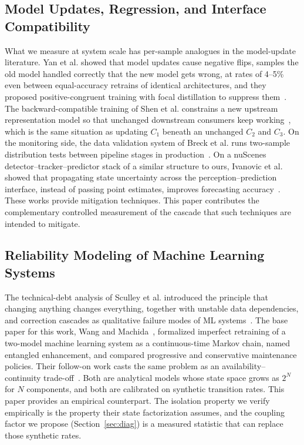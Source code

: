 \documentclass[conference]{IEEEtran}
\begin{document}
\subsection{Model Updates, Regression, and Interface Compatibility}
What we measure at system scale has per-sample analogues in the model-update
literature. Yan et al. showed that model updates cause negative flips, samples
the old model handled correctly that the new model gets wrong, at rates of
4--5\% even between equal-accuracy retrains of identical architectures, and
they proposed positive-congruent training with focal distillation to suppress
them~\cite{yan2021pctraining}. The backward-compatible training of Shen et al.
constrains a new upstream representation model so that unchanged downstream
consumers keep working~\cite{shen2020bct}, which is the same situation as
updating $C_1$ beneath an unchanged $C_2$ and $C_3$. On the monitoring side, the data
validation system of Breck et al. runs two-sample distribution tests between
pipeline stages in production~\cite{breck2019data}. On a nuScenes
detector--tracker--predictor stack of a similar structure to ours, Ivanovic et
al. showed that propagating state uncertainty across the
perception--prediction interface, instead of passing point estimates, improves
forecasting accuracy~\cite{ivanovic2022propagating}. These works
provide mitigation techniques. This paper contributes the complementary
controlled measurement of the cascade that such techniques are intended to
mitigate.

\subsection{Reliability Modeling of Machine Learning Systems}
The technical-debt analysis of Sculley et al. introduced the principle that
changing anything changes everything, together with unstable data
dependencies, and correction cascades as qualitative failure modes of ML
systems~\cite{sculley2015hidden}. The base paper for this work, Wang and
Machida~\cite{wang2024compsac}, formalized imperfect retraining of a
two-model machine learning system as a continuous-time Markov chain, named entangled
enhancement, and compared progressive and conservative maintenance policies.
Their follow-on work casts the same problem as an availability--continuity
trade-off~\cite{wang2025issre}. Both are analytical models whose state space
grows as $2^N$ for $N$ components, and both are calibrated on synthetic
transition rates. This paper provides an empirical counterpart. The isolation
property we verify empirically is the property their state factorization assumes, and
the coupling factor we propose (Section~\ref{sec:diag}) is a measured statistic
that can replace those synthetic rates.
\end{document}
